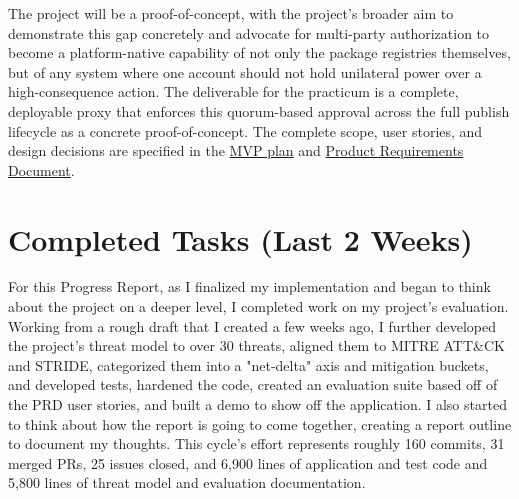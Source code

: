 \documentclass[12pt]{article}
\newcommand{\PRNumber}{5}
\newcommand{\RepoURL}{https://github.com/Ian-Costa18/Cybersecurity-Practicum/blob/progress-report-\PRNumber}
\begin{document}
The project will be a proof-of-concept, with the project's broader aim to demonstrate this gap concretely and advocate for multi-party authorization to become a platform-native capability of not only the package registries themselves, but of any system where one account should not hold unilateral power over a high-consequence action. The deliverable for the practicum is a complete, deployable proxy that enforces this quorum-based approval across the full publish lifecycle as a concrete proof-of-concept. The complete scope, user stories, and design decisions are specified in the \href{\RepoURL/docs/mvp.md}{MVP plan} and \href{\RepoURL/docs/mvp-prd.md}{Product Requirements Document}.

\section*{Completed Tasks (Last 2 Weeks)}

For this Progress Report, as I finalized my implementation and began to think about the project on a deeper level, I completed work on my project's evaluation. Working from a rough draft that I created a few weeks ago, I further developed the project's threat model to over 30 threats, aligned them to MITRE ATT\&CK and STRIDE, categorized them into a "net-delta" axis and mitigation buckets, and developed tests, hardened the code, created an evaluation suite based off of the PRD user stories, and built a demo to show off the application. I also started to think about how the report is going to come together, creating a report outline to document my thoughts. This cycle's effort represents roughly 160 commits, 31 merged PRs, 25 issues closed, and 6,900 lines of application and test code and 5,800 lines of threat model and evaluation documentation.
\end{document}
